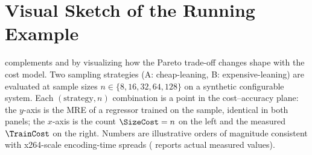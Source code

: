 \section{Visual Sketch of the Running Example}
\label{app:running-example-figure}

 complements  and
 by visualizing how the Pareto
trade-off changes shape with the cost model. Two sampling strategies
(A: cheap-leaning, B: expensive-leaning) are evaluated at sample sizes
$n\in\{8,16,32,64,128\}$ on a synthetic configurable system. Each
$(\text{strategy}, n)$ combination is a point in the cost--accuracy plane: the
$y$-axis is the MRE of a regressor trained on the sample, identical in
both panels; the $x$-axis is the count $\SizeCost=n$ on the left and
the measured $\TrainCost$ on the right. Numbers are illustrative orders
of magnitude consistent with x264-scale encoding-time spreads
( reports actual measured values).

